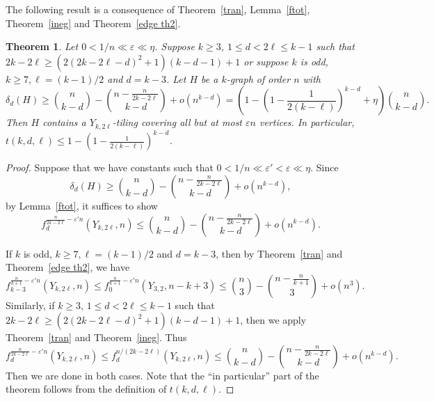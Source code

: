 \documentclass[11pt, reqno]{amsart}    	%
\newtheorem{thm}{Theorem}[section]
\theoremstyle{definition}
\numberwithin{equation}{section}
\begin{document}
	The following result is a consequence of Theorem~\ref{tran}, Lemma~\ref{ftot}, Theorem~\ref{ineg} and Theorem~\ref{edge th2}.
	\begin{thm} \label{yth}
		Let $ 0<1/n\ll\varepsilon\ll \eta $.	Suppose $k\ge3$, $1\le d < 2\ell \le k-1$ such that $2k-2\ell \ge (2(2k-2\ell-d)^2+1)(k-d-1)+1$ or suppose $ k $ is odd, $ k\ge7,\ell=(k-1)/2 $  and  $d=k-3$. Let $H$ be a $ k $-graph of order $n$ with \[\delta_{d}(H)\ge \binom{n}{k-d} - \binom{n-\frac{n}{2k-2\ell}}{k-d} + o(n^{k-d})=(1-(1-\frac{1}{2(k-\ell)})^{k-d}+\eta) \binom{n}{k-d}.\] Then $H$ contains a $Y_{k,2\ell}$-tiling covering all but at most $\varepsilon n$ vertices.
		In particular, $ t(k,d,\ell)\le 1-(1-\frac{1}{2(k-\ell)})^{k-d}$.
	\end{thm}
	\begin{proof}
		
	Suppose that we have constants such that  $0<1/n\ll\varepsilon'<  \varepsilon \ll \eta $. 
		Since 
		\[
		\delta_{d}(H)\ge \binom{n}{k-d} - \binom{n-\frac{n}{2k-2\ell}}{k-d} + o(n^{k-d}),\] by Lemma~\ref{ftot}, it suffices to show \[f_{d}^{\frac{n}{2k-2\ell}-\varepsilon' n}(Y_{k,2\ell},n)\le  \binom{n}{k-d}-\binom{n-\frac{n}{2k-2\ell}}{k-d}+o(n^{k-d}).  \tag{6.11}
		\]
		
		
		
		If $ k $ is odd, $ k\ge7,\ell=(k-1)/2 $  and  $d=k-3$, then
		by Theorem~\ref{tran} and Theorem~\ref{edge th2}, we have 
		\[
		f_{k-3}^{\frac{n}{k+1}-\varepsilon' n}(Y_{k,2\ell},n)\le f_{0}^{\frac{n}{k+1}-\varepsilon' n}(Y_{3,2},n-k+3)\le \binom{n}{3}-\binom{n-\frac{n}{k+1}}{3}+o(n^3).
		\] 
		Similarly, if $k\ge3$, $1\le d < 2\ell \le k-1$ such that $2k-2\ell \ge (2(2k-2\ell-d)^2+1)(k-d-1)+1$, then we apply  Theorem~\ref{tran} and Theorem~\ref{ineg}. 
		Thus	
		\[
		f_{d}^{\frac{n}{2k-2\ell}-\varepsilon' n}(Y_{k,2\ell},n) \le f_d^{n/(2k-2\ell)}(Y_{k, 2\ell}, n) \le \binom{n}{k-d} - \binom{n-\frac{n}{2k-2\ell}}{k-d} + o(n^{k-d}).
		\]
		Then we are done in both cases.
		Note that the ``in particular'' part of the theorem follows from the definition of $t(k,d,\ell)$.
	\end{proof}
	
	
\end{document}
